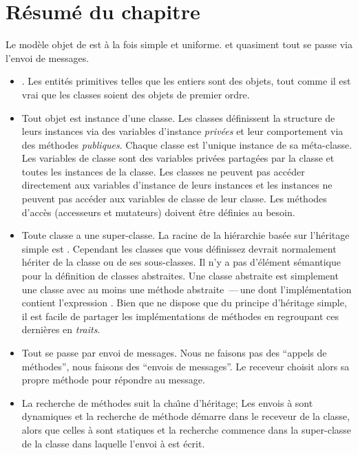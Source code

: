 \documentclass[a4paper,10pt,twoside]{book}
\begin{document}
\section{R\'esum\'e du chapitre}

Le mod\`ele objet de \squeak est \`a la fois simple et uniforme.
\Mantra et quasiment tout se passe via l'envoi de messages.

\begin{itemize}
  \item \Mantra.
  Les entit\'es primitives telles que les entiers sont des objets, tout comme
il est vrai que les classes soient des objets de premier ordre.

  \item Tout objet est instance d'une classe.
Les classes d\'efinissent la structure de leurs instances via des
variables d'instance \emph{priv\'ees} et leur comportement 
via des m\'ethodes \emph{publiques}. Chaque classe est l'unique
instance de sa m\'eta-classe.
Les variables de classe sont des variables priv\'ees partag\'ees par la classe
et toutes les instances de la classe.
Les classes ne peuvent pas acc\'eder directement aux variables d'instance de
leurs instances et les instances ne peuvent pas acc\'eder aux variables de
classe de leur classe.
Les m\'ethodes d'acc\`es (accesseurs et mutateurs) doivent \^etre
d\'efinies au besoin.  

  \item Toute classe a une super-classe.
  La racine de la hi\'erarchie bas\'ee sur l'h\'eritage simple est .
	Cependant les classes que vous d\'efinissez devrait normalement h\'eriter de la classe  ou de ses sous-classes.
Il n'y a pas d'\'el\'ement s\'emantique pour la d\'efinition de classes abstraites.
Une classe abstraite est simplement une classe avec au moins une m\'ethode abstraite
\,---\,une dont l'impl\'ementation contient l'expression 
.
  Bien que \squeak ne dispose que du principe d'h\'eritage simple, 
il est facile de partager les impl\'ementations de m\'ethodes
en regroupant ces derni\`eres en \emph{traits}.

  \item Tout se passe par envoi de messages.
	Nous ne faisons pas des ``appels de m\'ethodes'', nous
	faisons des ``envois de messages''.
Le receveur choisit alors sa propre m\'ethode pour r\'epondre au message.

  \item La recherche de m\'ethodes suit la cha\^{\i}ne d'h\'eritage;
  Les envois \`a \self sont dynamiques et la recherche de m\'ethode
d\'emarre dans le receveur de la classe, alors que
celles \`a \super sont statiques
et la recherche commence dans la super-classe de la classe dans laquelle l'envoi
\`a \super est \'ecrit.


\end{itemize}
\end{document}
